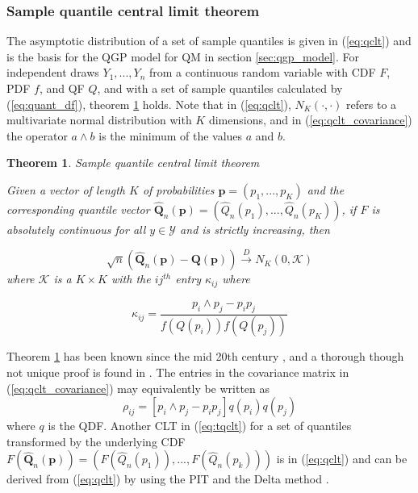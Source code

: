 \documentclass[preprint,12pt,authoryear]{elsarticle}
\newtheorem{theorem}{Theorem}
\begin{document}
\subsubsection{Sample quantile central limit theorem} 

The asymptotic distribution of a set of sample quantiles is given in (\ref{eq:qclt}) and is the basis for the QGP model for QM in section \ref{sec:qgp_model}. For independent draws $Y_1, ..., Y_n$ from a continuous random variable with CDF $F$, PDF $f$, and QF $Q$, and with a set of sample quantiles calculated by (\ref{eq:quant_df}), theorem \ref{thm:qclt} holds. Note that in (\ref{eq:qclt}), $N_K(\cdot, \cdot)$ refers to a multivariate normal distribution with $K$ dimensions, and in (\ref{eq:qclt_covariance}) the operator $a \wedge b$ is the minimum of the values $a$ and $b$.

\begin{theorem}{\emph{Sample quantile central limit theorem}}
\label{thm:qclt}

Given a vector of length $K$ of probabilities $\boldsymbol{p} = (p_1, ..., p_K)$ and the corresponding quantile vector $\hat{\boldsymbol{Q}}_n(\boldsymbol{p}) = (\hat{Q}_n(p_1), ..., \hat{Q}_n(p_K))$, if $F$ is absolutely continuous for all $y \in \mathcal{Y}$ and is strictly increasing, then

\begin{equation}
    \label{eq:qclt}
    \sqrt{n}(\hat{\boldsymbol{Q}}_n(\boldsymbol{p}) - \boldsymbol{Q}(\boldsymbol{p})) \overset{D}{\rightarrow} N_K(0, \boldsymbol{\mathcal{K}})
\end{equation}
where $\boldsymbol{\mathcal{K}}$ is a $K\times K$ with the $ij^{th}$ entry $\kappa_{ij}$ where

\begin{equation}
    \label{eq:qclt_covariance}
    \kappa_{ij} = \frac{p_i \wedge p_j - p_i p_j}{f(Q(p_i)) f(Q(p_j))}
\end{equation}
\end{theorem}

Theorem \ref{thm:qclt} has been known since the mid 20th century \cite[]{cramer1951mathematical}, and a thorough though not unique proof is found in \cite{walker1968note}. The entries in the covariance matrix in (\ref{eq:qclt_covariance}) may equivalently be written as
\begin{equation}
    \rho_{ij} = [p_i \wedge p_j - p_i p_j]q(p_i)q(p_j)
    \label{eq:qgp_simp_cov}
\end{equation}
where $q$ is the QDF. Another CLT in (\ref{eq:tqclt}) for a set of quantiles transformed by the underlying CDF $F(\hat{\boldsymbol{Q}}_n(\boldsymbol{p})) = (F(\hat{Q}_n(p_1)), ..., F(\hat{Q}_n(p_k)))$ is in (\ref{eq:qclt}) and can be derived from (\ref{eq:qclt}) by using the PIT and the Delta method \cite[]{parzen2004quantile}.
\end{document}
